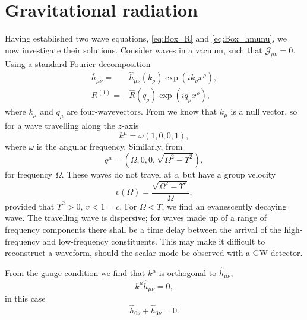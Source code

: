 \section{Gravitational radiation}\label{sec:Rad}

Having established two wave equations, \eqref{eq:Box_R} and \eqref{eq:Box_hmunu}, we now investigate their solutions. Consider waves in a vacuum, such that $\mathcal{G}_{\mu\nu} = 0$. Using a standard Fourier decomposition
\begin{subequations}
\begin{align}
\overline{h}_{\mu\nu} = {} & \widehat{h}_{\mu\nu}(k_\rho) \exp\left(ik_\rho x^\rho\right),\\
R^{(1)} = {} & \widehat{R}(q_\rho) \exp\left(iq_\rho x^\rho\right),
\end{align}
\end{subequations}
where $k_\mu$ and $q_\mu$ are four-wavevectors. From  we know that $k_\mu$ is a null vector, so for a wave travelling along the $z$-axis
\begin{equation}
k^\mu = \omega(1, 0, 0, 1),
\end{equation}
where $\omega$ is the angular frequency. Similarly, from 
\begin{equation}
q^\mu = \left(\Omega, 0, 0, \sqrt{\Omega^2 - \Upsilon^2}\right),
\label{eq:Ricci_q}
\end{equation}
for frequency $\Omega$. These waves do not travel at $c$, but have a group velocity
\begin{equation}
v(\Omega) = \frac{\sqrt{\Omega^2 - \Upsilon^2}}{\Omega},
\end{equation}
provided that $\Upsilon^2 > 0$, $v < 1 = c$. For $\Omega < \Upsilon$, we find an evanescently decaying wave. The travelling wave is dispersive; for waves made up of a range of frequency components there shall be a time delay between the arrival of the high-frequency and low-frequency constituents. This may make it difficult to reconstruct a waveform, should the scalar mode be observed with a GW detector.

From the gauge condition  we find that $k^\mu$ is orthogonal to $\widehat{h}_{\mu\nu}$,
\begin{equation}
k^\mu\widehat{h}_{\mu\nu} = 0,
\end{equation}
in this case
\begin{equation}
\widehat{h}_{0\nu} + \widehat{h}_{3\nu} = 0.
\label{eq:Transverse}
\end{equation}

